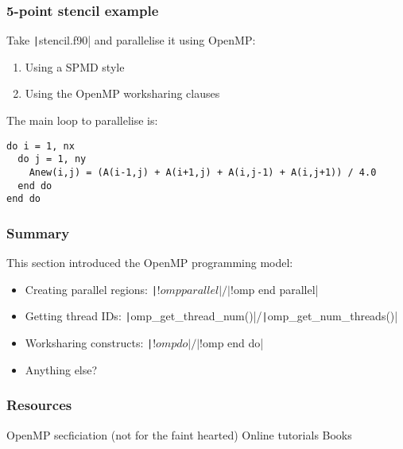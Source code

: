\documentclass{beamer}
\begin{document}
\begin{frame}[fragile]
\frametitle{5-point stencil example}
Take \texttt|stencil.f90| and parallelise it using OpenMP:
\begin{enumerate}
  \item Using a SPMD style
  \item Using the OpenMP worksharing clauses
\end{enumerate}

The main loop to parallelise is:
\begin{verbatim}
do i = 1, nx
  do j = 1, ny
    Anew(i,j) = (A(i-1,j) + A(i+1,j) + A(i,j-1) + A(i,j+1)) / 4.0
  end do
end do
\end{verbatim}
\end{frame}

\begin{frame}
\frametitle{Summary}
This section introduced the OpenMP programming model:
\begin{itemize}
  \item Creating parallel regions: \texttt|!$omp parallel|/\texttt|!$omp end parallel|
  \item Getting thread IDs: \texttt|omp_get_thread_num()|/\texttt|omp_get_num_threads()|
  \item Worksharing constructs: \texttt|!$omp do|/\texttt|!$omp end do|
  \item Anything else?
\end{itemize}
\end{frame}

\begin{frame}
\frametitle{Resources}
OpenMP secficiation (not for the faint hearted)
Online tutorials
Books
\end{frame}

\end{document}
